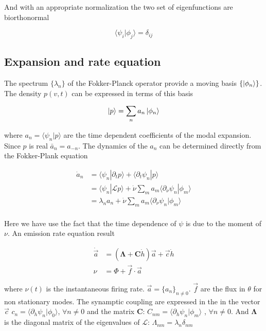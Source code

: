 \documentclass[a4paper,11pt,twoside]{article}
\numberwithin{equation}{section}
\begin{document}
And with an appropriate normalization the two set of eigenfunctions are biorthonormal

\begin{equation}
\label{eq:dij}
\langle\psi_i|\phi_j\rangle=\delta_{ij}
\end{equation}



\subsection{Expansion and rate equation}
The spectrum $\{\lambda_n\}$ of the Fokker-Planck operator provide a moving basis $ \{\ket{\phi_n}\}$. The density $p(v,t)$ can be expressed in terms of this basis

\begin{equation}
\label{eq:p}
\ket{p}=\sum_na_n\ket{\phi_n}
\end{equation}

where $a_n=\langle \psi_n | p\rangle$ are the time dependent coefficients of the modal expansion. Since $p$ is real $\bar{a}_n=a_{-n}$. The dynamics of the $a_n$ can be determined directly from the Fokker-Plank equation

\begin{align}
\dot{a}_n&=\langle\psi_n|\partial_t p\rangle+\langle\partial_t\psi_n|p\rangle \nonumber \\
&=\langle\psi_n|\mathcal{L}p\rangle+  \dot{\nu}\sum_ma_m\langle\partial_\nu\psi_n|\phi_m \rangle \nonumber \\
&=\lambda_n a_n +  \dot{\nu}\sum_ma_m\langle\partial_\nu\psi_n|\phi_m \rangle \nonumber \\
\end{align}

Here we have use the fact that the time dependence of $\psi$ is due to the moment of $\nu$. An emission rate equation result

\begin{align}
\dot{\vec{a}}&=(\boldsymbol{\Lambda}+\boldsymbol{C}\dot{h})\vec{a}+\vec{c}\dot{h}\nonumber\\
\nu&=\Phi+\vec{f}\cdot\vec{a}
\end{align}

where $\nu(t)$ is the instantaneous firing rate. $\vec{a}=\{a_n\}_{n \neq 0}$. $\vec{f}$ are the flux in $\theta$ for non stationary modes. The synamptic coupling are expressed in the in the vector $\vec{c}$ $c_n=\langle\partial_h\psi_n|\phi_0\rangle$, $\forall n \neq 0$ and the matrix $\boldsymbol{C}$: $C_{nm}=\langle\partial_h\psi_n|\phi_m\rangle$ , $\forall n \neq 0$. And $\boldsymbol{\Lambda}$ is the diagonal matrix of the eigenvalues of $\mathcal{L}$: $\Lambda_{nm}=\lambda_n\delta_{nm}$
\end{document}
